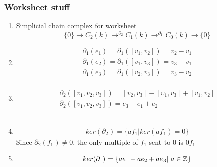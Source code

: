 \documentclass[../notes.tex]{subfiles}
\begin{document}
\subsubsection{Worksheet stuff}
\begin{enumerate}
    \item Simplicial chain complex for worksheet
        \[
            \{0\}\rightarrow C_2(k)
            \rightarrow^{\partial_2}C_1(k)
            \rightarrow^{\partial_1}C_0(k)
            \rightarrow \{0\}
        \]
    \item 
        \begin{align*}
            \partial_1(e_1) = \partial_1([v_1,v_2]) = v_2-v_1\\
            \partial_1(e_2) = \partial_1([v_1,v_3]) = v_3-v_1\\
            \partial_1(e_3) = \partial_1([v_2,v_3]) = v_3-v_2\\
        \end{align*}
    \item 
        \begin{align*}
            \partial_2([v_1,v_2,v_3])=[v_2,v_3]-[v_1,v_3]+[v_1,v_2]\\
            \partial_2([v_1,v_2,v_3])=e_3-e_1+e_2
        \end{align*}\\
        \begin{center}
        \end{center}
    \item 
        \begin{align*}
            ker(\partial_2)=\{af_1| ker(af_1)=0\}
        \end{align*}
        Since $\partial_2(f_1)\neq 0$, the only multiple of $f_1$ sent to 0 is $0f_1$
    \item
        \[
            ker(\partial_1)=\{ae_1-ae_2+ae_3|\ a\in \Z\}
        \]
\end{enumerate}
\end{document}
